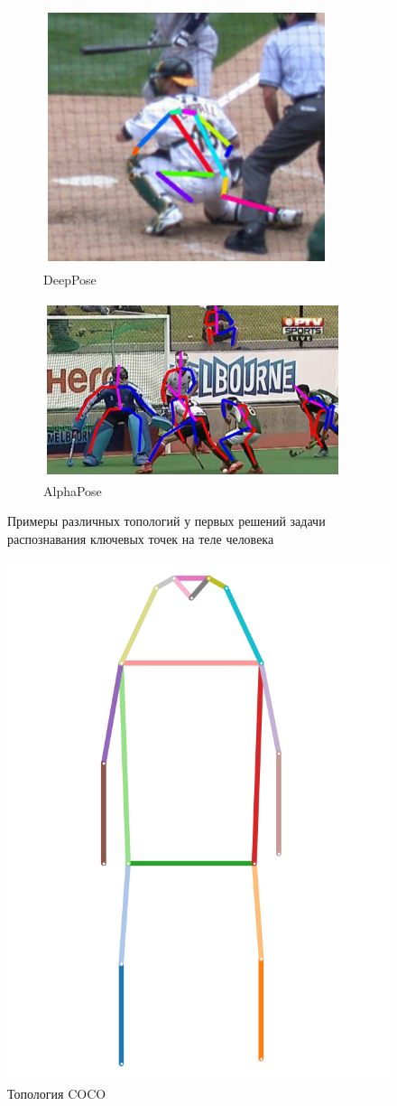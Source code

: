 \begin{figure}[t]
\begin{subfigure}[b]{.3\textwidth}
	\includegraphics[width=\textwidth]{./images/deeppose_topology.png}
	\caption{DeepPose \cite{DeepPose}}
\end{subfigure}
\begin{subfigure}[b]{.455\textwidth}
	\centering
	\includegraphics[width=\textwidth]{./images/alphapose_topology.png}
	\caption{AlphaPose \cite{AlphaPose}}
\end{subfigure}
\caption{Примеры различных топологий у первых решений задачи распознавания ключевых точек на теле человека}
\label{fig:topology_examples}
\end{figure}

\begin{figure}[h]
	\centering
	\includegraphics[width=.3\textwidth]{./images/coco_topology.png}
	\caption{Топология COCO}
	\label{fig:coco_topology}
\end{figure}

